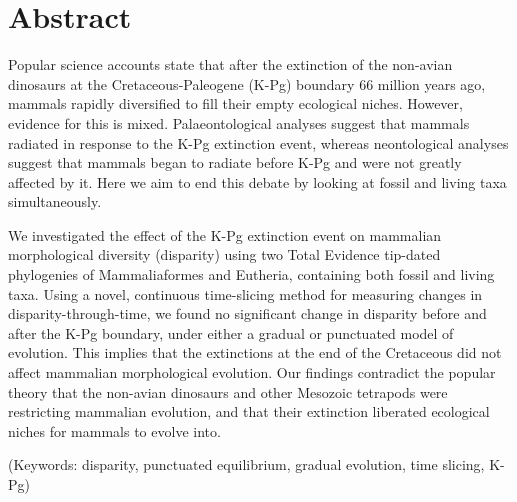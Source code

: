 %
%

\newpage
\section*{Abstract}

Popular science accounts state that after the extinction of the non-avian dinosaurs at the Cretaceous-Paleogene (K-Pg) boundary 66 million years ago, mammals rapidly diversified to fill their empty ecological niches.
However, evidence for this is mixed. 
Palaeontological analyses suggest that mammals radiated in response to the K-Pg extinction event, whereas neontological analyses suggest that mammals began to radiate before K-Pg and were not greatly affected by it. 
Here we aim to end this debate by looking at fossil and living taxa simultaneously.

We investigated the effect of the K-Pg extinction event on mammalian morphological diversity (disparity) using two Total Evidence tip-dated phylogenies of Mammaliaformes and Eutheria, containing both fossil and living taxa. 
Using a novel, continuous time-slicing method for measuring changes in disparity-through-time, we found no significant change in disparity before and after the K-Pg boundary, under either a gradual or punctuated model of evolution.
This implies that the extinctions at the end of the Cretaceous did not affect mammalian morphological evolution. 
Our findings contradict the popular theory that the non-avian dinosaurs and other Mesozoic tetrapods were restricting mammalian evolution, and that their extinction liberated ecological niches for mammals to evolve into.

\noindent (Keywords: disparity, punctuated equilibrium, gradual evolution, time slicing, K-Pg)\\

\vspace{1.5in}

\newpage 

%
%

